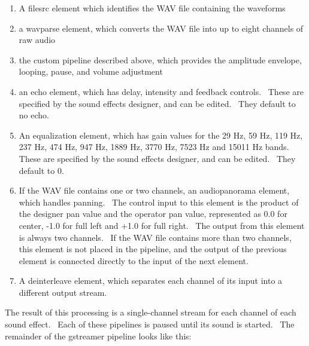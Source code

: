 \documentclass[letterpaper]{article}
\newcommand\liststyleLxviii{%
\renewcommand\theenumi{\arabic{enumi}}
\renewcommand\theenumii{\arabic{enumii}}
\renewcommand\theenumiii{\arabic{enumiii}}
\renewcommand\theenumiv{\arabic{enumiv}}
\renewcommand\labelenumi{\theenumi.}
\renewcommand\labelenumii{\theenumii.}
\renewcommand\labelenumiii{\theenumiii.}
\renewcommand\labelenumiv{\theenumiv.}
}
\begin{document}
\liststyleLxviii
\begin{enumerate}
\item A filesrc element which identifies the WAV file containing the
waveforms
\item a wavparse element, which converts the WAV file into up to eight
channels of raw audio
\item the custom pipeline described above, which provides the amplitude
envelope, looping, pause, and volume adjustment
\item an echo element, which has delay, intensity and feedback controls.
\ These are specified by the sound effects designer, and can be edited.
\ They default to no echo.
\item An equalization element, which has gain values for the 29 Hz, 59
Hz, 119 Hz, 237 Hz, 474 Hz, 947 Hz, 1889 Hz, 3770 Hz, 7523 Hz and 15011
Hz bands. These are specified by the sound effects designer, and can be
edited. \ They default to 0.
\item If the WAV file contains one or two channels, an audiopanorama
element, which handles panning. \ The control input to this element is
the product of the designer pan value and the operator pan value,
represented as 0.0 for center, -1.0 for full left and +1.0 for full
right. \ The output from this element is always two channels. \ If the
WAV file contains more than two channels, this element is not placed in
the pipeline, and the output of the previous element is connected
directly to the input of the next element.
\item A deinterleave element, which separates each channel of its input
into a different output stream.
\end{enumerate}
The result of this processing is a single-channel stream for each
channel of each sound effect. \ Each of these pipelines is paused until
its sound is started. \ The remainder of the gstreamer pipeline looks
like this:
\end{document}
